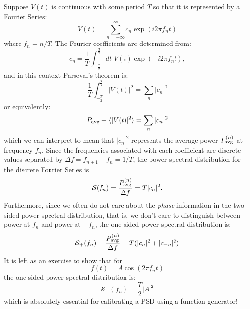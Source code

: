 \documentclass[12pt]{article}
\begin{document}
Suppose $V(t)$ is continuous with some period $T$ so that it is represented by a Fourier Series:
\begin{displaymath}
V(t) = \sum_{n=-\infty}^{\infty} c_n \exp(i2\pi f_n t)
\end{displaymath}
where $f_n = n / T$.  The Fourier coefficients are determined from:
\begin{equation}
c_n = \frac{1}{T} \int_{-\frac{T}{2}}^{\frac{T}{2}} dt \; V(t) \exp(-i2\pi f_n t), \label{eqn:freqcoeff}
\end{equation}
and in this context Parseval's theorem is:
\begin{displaymath}
\frac{1}{T} \int_{-\frac{T}{2}}^{\frac{T}{2}} |V(t)|^2 = \sum_n |c_n|^2
\end{displaymath}
or equivalently:
\begin{displaymath}
P_{\rm avg} \equiv \braket{|V(t)|^2} = \sum_n |c_n|^2
\end{displaymath}
which we can interpret to mean that $|c_n|^2$ represents the average power $P_{\rm avg}^{(n)}$ at frequency $f_n$.  Since the frequencies associated with each coefficient are discrete values separated by $\Delta f = f_{n+1} - f_{n} = 1/T $, the power spectral distribution for the discrete Fourier Series is
\begin{displaymath}
\mathcal{S}(f_n) = \frac{P_{\rm avg}^{(n)}}{\Delta f} = T |c_n|^2.
\end{displaymath}
Furthermore, since we often do not care about the {\em phase} information in the two-sided power spectral distribution, that is, we don't care to distinguish between power at $f_n$ and power at $-f_n$, the one-sided power spectral distribution is:
\begin{equation}
\mathcal{S}_{+}(f_n) = \frac{P_{\rm avg}^{(n)}}{\Delta f} = T (|c_n|^2 + |c_{-n}|^2) \label{eqn:discretepsd}
\end{equation}
It is left as an exercise to show that for
\begin{displaymath}
f(t) = A \cos( 2 \pi f_n t)
\end{displaymath}
the one-sided power spectral distribution is:
\begin{equation}
\mathcal{S}_{+}(f_n) = \frac{T}{2} |A|^2 \label{eqn:psdcalib}
\end{equation}
which is absolutely essential for calibrating a PSD using a function generator!

%
%
\end{document}
